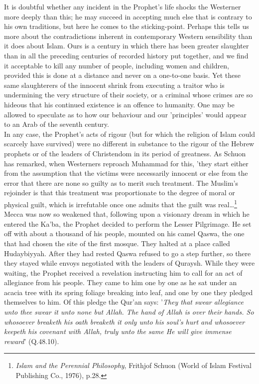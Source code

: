 \documentclass[11pt, b5paper, twoside]{book}
\begin{document}
It is doubtful whether any incident in the Prophet's life shocks the Westerner more deeply than this; 
he may succeed in accepting much else that is contrary to his own traditions, but here he comes to 
the sticking-point. Perhaps this tells us more about the contradictions inherent in contemporary 
Western sensibility than it does about Islam. Ours is a century in which there has been greater 
slaughter than in all the preceding centuries of recorded history put together, and we find it 
acceptable to kill any number of people, including women and children, provided this is done at a 
distance and never on a one-to-one basis. Yet these same slaughterers of the innocent shrink from 
executing a traitor who is undermining the very structure of their society, or a criminal whose 
crimes are so hideous that his continued existence is an offence to humanity. One may be allowed to 
speculate as to how our behaviour and our 'principles' would appear to an Arab of the seventh 
century. \\

In any case, the Prophet's acts of rigour (but for which the religion of Islam could scarcely have 
survived) were no different in substance to the rigour of the Hebrew prophets or of the leaders of 
Christendom in its period of greatness. As Schuon has remarked, when Westerners reproach Muhammad for 
this, 'they start either from the assumption that the victims were necessarily innocent or else from 
the error that there are none so guilty as to merit such treatment. The Muslim's rejoinder is that 
this treatment was proportionate to the degree of moral or physical guilt, which is irrefutable once 
one admits that the guilt was real\ldots{}\footnote{\emph{Islam and the Perennial Philosophy}, Frithjof Schuon (World of Islam Festival Publishing Co., 1976), p.28.}\\

Mecca was now so weakened that, following upon a visionary dream in which he entered the Ka'ba, the 
Prophet decided to perform the Lesser Pilgrimage. He set off with about a thousand of his people, 
mounted on his camel Qaswa, the one that had chosen the site of the first mosque. They halted at a 
place called Hudaybiyyah. After they had rested Qaswa refused to go a step further, so there they 
stayed while envoys negotiated with the leaders of Quraysh. While they were waiting, the Prophet 
received a revelation instructing him to call for an act of allegiance from his people. They came to 
him one by one as he sat under an acacia tree with its spring foliage breaking into leaf, and one by 
one they pledged themselves to him. Of this pledge the Qur'an says: '\emph{They that swear allegiance unto thee swear it unto none but Allah. The hand of Allah is over their hands. So whosoever breaketh his 
oath breaketh it only unto his soul's hurt and whosoever keepeth his covenant with Allah, truly unto 
the same He will give immense reward}' (Q.48.10). \\
\end{document}
